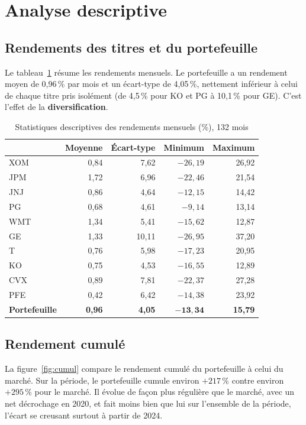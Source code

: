 \documentclass[11pt,a4paper]{article}
\begin{document}
\section{Analyse descriptive}

\subsection{Rendements des titres et du portefeuille}
Le tableau~\ref{tab:desc} résume les rendements mensuels. Le portefeuille a un rendement moyen de 0,96\,\% par mois et un écart-type de 4,05\,\%, nettement inférieur à celui de chaque titre pris isolément (de 4,5\,\% pour KO et PG à 10,1\,\% pour GE). C'est l'effet de la \textbf{diversification}.

\begin{table}[H]
\centering
\caption{Statistiques descriptives des rendements mensuels (\%), 132 mois}
\label{tab:desc}
\begin{tabular}{lrrrr}
\toprule
 & Moyenne & Écart-type & Minimum & Maximum \\
\midrule
XOM & 0,84 & 7,62 & $-26{,}19$ & 26,92 \\
JPM & 1,72 & 6,96 & $-22{,}46$ & 21,54 \\
JNJ & 0,86 & 4,64 & $-12{,}15$ & 14,42 \\
PG & 0,68 & 4,61 & $-9{,}14$ & 13,14 \\
WMT & 1,34 & 5,41 & $-15{,}62$ & 12,87 \\
GE & 1,33 & 10,11 & $-26{,}95$ & 37,20 \\
T & 0,76 & 5,98 & $-17{,}23$ & 20,95 \\
KO & 0,75 & 4,53 & $-16{,}55$ & 12,89 \\
CVX & 0,89 & 7,81 & $-22{,}37$ & 27,28 \\
PFE & 0,42 & 6,42 & $-14{,}38$ & 23,92 \\
\midrule
\textbf{Portefeuille} & \textbf{0,96} & \textbf{4,05} & $\mathbf{-13{,}34}$ & \textbf{15,79} \\
\bottomrule
\end{tabular}
\end{table}

\subsection{Rendement cumulé}
La figure~\ref{fig:cumul} compare le rendement cumulé du portefeuille à celui du marché. Sur la période, le portefeuille cumule environ $+217\,\%$ contre environ $+295\,\%$ pour le marché. Il évolue de façon plus régulière que le marché, avec un net décrochage en 2020, et fait moins bien que lui sur l'ensemble de la période, l'écart se creusant surtout à partir de 2024.
\end{document}
